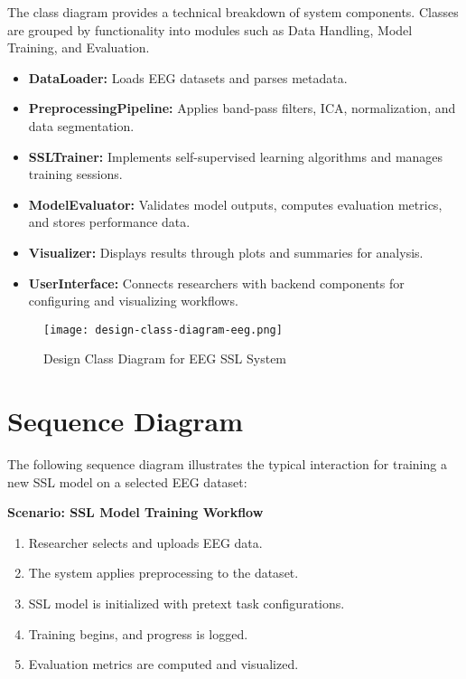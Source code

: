 The class diagram provides a technical breakdown of system components. Classes are grouped by functionality into modules such as Data Handling, Model Training, and Evaluation.

\begin{itemize}
    \item \textbf{DataLoader:} Loads EEG datasets and parses metadata.
    \item \textbf{PreprocessingPipeline:} Applies band-pass filters, ICA, normalization, and data segmentation.
    \item \textbf{SSLTrainer:} Implements self-supervised learning algorithms and manages training sessions.
    \item \textbf{ModelEvaluator:} Validates model outputs, computes evaluation metrics, and stores performance data.
    \item \textbf{Visualizer:} Displays results through plots and summaries for analysis.
    \item \textbf{UserInterface:} Connects researchers with backend components for configuring and visualizing workflows.
\end{itemize}

\begin{figure}[H]
    \centering
    \texttt{[image: design-class-diagram-eeg.png]}
    \caption{Design Class Diagram for EEG SSL System}
    \label{fig:figure7}
\end{figure}

\section{Sequence Diagram}
\label{sec:sequence-diagram}

The following sequence diagram illustrates the typical interaction for training a new SSL model on a selected EEG dataset:

\textbf{Scenario: SSL Model Training Workflow}
\begin{enumerate}
    \item Researcher selects and uploads EEG data.
    \item The system applies preprocessing to the dataset.
    \item SSL model is initialized with pretext task configurations.
    \item Training begins, and progress is logged.
    \item Evaluation metrics are computed and visualized.
\end{enumerate}

